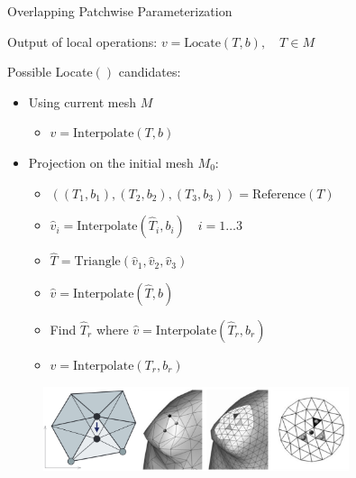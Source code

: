 \documentclass{beamer}
\begin{document}
\begin{frame}[plain]{Overlapping Patchwise Parameterization}

  Output of local operations: $v =\text{Locate} (T,b), \quad T \in M$
  
  Possible Locate$()$ candidates:
  
  \begin{itemize}
  \item Using current mesh $M$
    \begin{itemize}
    \item $ v = \text{Interpolate} (T,b)$
    \end{itemize}    
  \item Projection on the initial mesh $M_0$:
    \begin{itemize}
    \item  $( (T_1,b_1), (T_2, b_2), (T_3, b_3) ) = \text{Reference} (T)$
    \item $ \hat{v}_i = \text{Interpolate}(\hat T_i, b_i) \quad
      i=1\ldots 3$
    \item  $ \hat T = \text{Triangle} (\hat v_1, \hat v_2, \hat v_3) $
    \item  $ \hat v = \text{Interpolate}(\hat T, b)$
    \item Find $\hat T_r$ where $\hat v = \text{Interpolate}( \hat
      T_r, b_r) $
    \item $ v =  \text{Interpolate}(T_r, b_r)$
    \end{itemize}
  \end{itemize}    

  \begin{figure}
    \includegraphics[width=0.8\textwidth]{../image/original_proj.png}
  \end{figure}

\end{frame}

\end{document}
